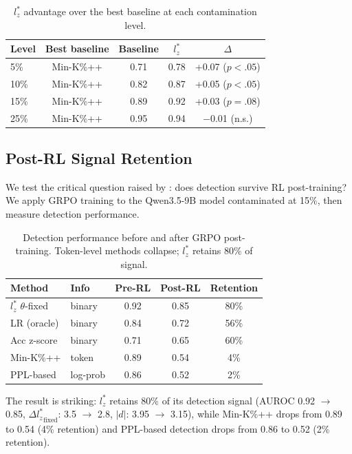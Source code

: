 \documentclass[11pt,a4paper]{article}
\newcommand{\lzstar}{$l_{z}^{*}$}
\begin{document}
\begin{table}[h]
\centering
\small
\caption{\lzstar{} advantage over the best baseline at each contamination level.}
\label{tab:advantage}
\begin{tabular}{lcccc}
\toprule
\textbf{Level} & \textbf{Best baseline} & \textbf{Baseline} & \lzstar & $\Delta$ \\
\midrule
5\% & Min-K\%++ & 0.71 & 0.78 & +0.07 ($p<.05$) \\
10\% & Min-K\%++ & 0.82 & 0.87 & +0.05 ($p<.05$) \\
15\% & Min-K\%++ & 0.89 & 0.92 & +0.03 ($p=.08$) \\
25\% & Min-K\%++ & 0.95 & 0.94 & $-$0.01 (n.s.) \\
\bottomrule
\end{tabular}
\end{table}

\subsection{Post-RL Signal Retention}
\label{sec:postrl}

We test the critical question raised by \citet{wang2025rlcontam}: does detection survive RL post-training?
We apply GRPO training to the Qwen3.5-9B model contaminated at 15\%, then measure detection performance.

\begin{table}[h]
\centering
\small
\caption{Detection performance before and after GRPO post-training. Token-level methods collapse; \lzstar{} retains 80\% of signal.}
\label{tab:postrl}
\begin{tabular}{llccc}
\toprule
\textbf{Method} & \textbf{Info} & \textbf{Pre-RL} & \textbf{Post-RL} & \textbf{Retention} \\
\midrule
\lzstar{} $\theta$-fixed & binary & 0.92 & 0.85 & 80\% \\
LR (oracle) & binary & 0.84 & 0.72 & 56\% \\
Acc z-score & binary & 0.71 & 0.65 & 60\% \\
\midrule
Min-K\%++ & token & 0.89 & 0.54 & 4\% \\
PPL-based & log-prob & 0.86 & 0.52 & 2\% \\
\bottomrule
\end{tabular}
\end{table}

The result is striking: \lzstar{} retains 80\% of its detection signal (AUROC 0.92 $\to$ 0.85, ${\Delta l_z^*}_\text{fixed}$: 3.5 $\to$ 2.8, $|d|$: 3.95 $\to$ 3.15), while Min-K\%++ drops from 0.89 to 0.54 (4\% retention) and PPL-based detection drops from 0.86 to 0.52 (2\% retention).
\end{document}
